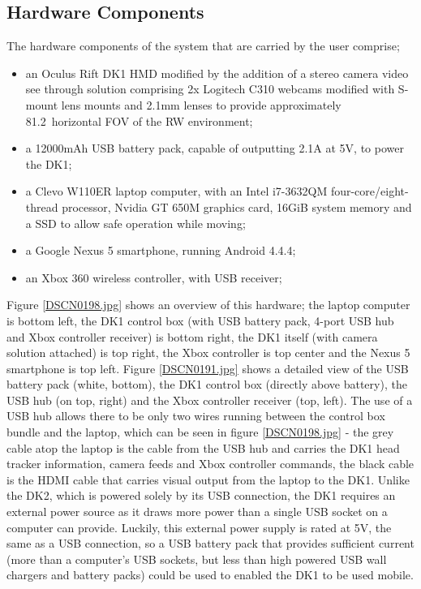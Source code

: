 \subsection{Hardware Components}
The hardware components of the system that are carried by the user comprise;
\begin{itemize}
	\item an Oculus Rift DK1 HMD modified by the addition of a stereo camera video see through solution comprising 2x Logitech C310 webcams modified with S-mount lens mounts and 2.1mm lenses to provide approximately 81.2\textdegree\ horizontal FOV of the RW environment;
	\item a 12000mAh USB battery pack, capable of outputting 2.1A at 5V, to power the DK1;
	\item a Clevo W110ER laptop computer, with an Intel i7-3632QM four-core/eight-thread processor, Nvidia GT 650M graphics card, 16GiB system memory and a SSD to allow safe operation while moving;
	\item a Google Nexus 5 smartphone, running Android 4.4.4;
	\item an Xbox 360 wireless controller, with USB receiver;
\end{itemize}

Figure \ref{DSCN0198.jpg} shows an overview of this hardware; the laptop computer is bottom left, the DK1 control box (with USB battery pack, 4-port USB hub and Xbox controller receiver) is bottom right, the DK1 itself (with camera solution attached) is top right, the Xbox controller is top center and the Nexus 5 smartphone is top left. Figure \ref{DSCN0191.jpg} shows a detailed view of the USB battery pack (white, bottom), the DK1 control box (directly above battery), the USB hub (on top, right) and the Xbox controller receiver (top, left). The use of a USB hub allows there to be only two wires running between the control box bundle and the laptop, which can be seen in figure \ref{DSCN0198.jpg} - the grey cable atop the laptop is the cable from the USB hub and carries the DK1 head tracker information, camera feeds and Xbox controller commands, the black cable is the HDMI cable that carries visual output from the laptop to the DK1. Unlike the DK2, which is powered solely by its USB connection, the DK1 requires an external power source as it draws more power than a single USB socket on a computer can provide. Luckily, this external power supply is rated at 5V, the same as a USB connection, so a USB battery pack that provides sufficient current (more than a computer's USB sockets, but less than high powered USB wall chargers and battery packs) could be used to enabled the DK1 to be used mobile.

